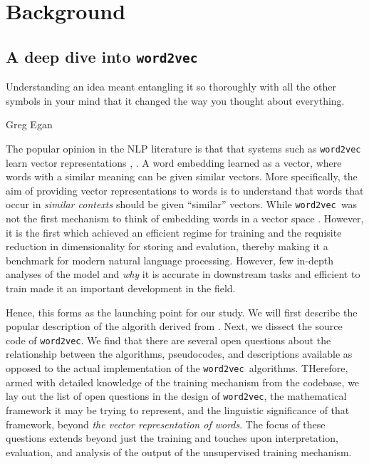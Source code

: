 \documentclass[11pt]{book}
\newcommand{\wtov}{\texttt{word2vec }}
\begin{document}
\chapter{Background}
\section{A deep dive into \wtov}
\label{chapter:deep-dive-wtov}

\epigraph{Understanding an idea meant entangling it so thoroughly with all the
other symbols in your mind that it changed the way you thought about
everything.}{Greg Egan}

The popular opinion in the NLP literature
is that that systems such as \texttt{word2vec} learn
vector representations \cite{levy2014neural}, \cite{pennington2014glove}.  A word
embedding learned as a vector, where words with a similar meaning can be given
similar vectors. More specifically, the aim of providing vector representations
to words is to understand that words that occur in \textit{similar contexts}
should be given ``similar'' vectors. While \wtov was not the first mechanism to
think of embedding words in a vector space
\cite{baroni2010distributional,bruni2012distributional}. However, it is the
first which achieved an efficient regime for training and the requisite
reduction in dimensionality for storing and evalution, thereby making it a
benchmark for modern natural language processing. However, few in-depth analyses
of the model and \textit{why} it is accurate in downstream tasks and efficient
to train made it an important development in the field.


Hence, this forms as the launching point for our study. We will
first describe the popular description of the algorith derived from
\cite{mikolov2013efficient}. Next, we dissect the
source code of \texttt{word2vec}. We find that there are several open questions
about the relationship between the algorithms, pseudocodes, and descriptions
available as opposed to the actual implementation of the \wtov algorithms.
THerefore, armed with detailed knowledge of the training mechanism from the
codebase, we lay out the list of open questions in the design of
\texttt{word2vec}, the mathematical framework it may be trying to represent, and
the linguistic significance of that framework, beyond \textit{the vector
  representation of words}. The focus of these questions extends beyond just the
training and touches upon interpretation, evaluation, and analysis of the output
of the unsupervised training mechanism.
\end{document}
